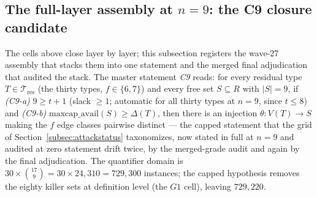 \subsection{The full-layer assembly at $n=9$: the C9 closure candidate}
\label{subsec:c9asm}

The cells above close layer by layer; this subsection registers the wave-27
assembly that stacks them into one statement and the merged final adjudication
that audited the stack. The master statement \emph{C9} reads: for every
residual type $T\in\mathcal{T}_{\mathrm{res}}$ (the thirty types,
$f\in\{6,7\}$) and every free set $S\subseteq R$ with $|S|=9$, if
\emph{(C9-a)} $9\ge t+1$ (slack $\ge1$; automatic for all thirty types at
$n=9$, since $t\le8$) and \emph{(C9-b)} $\mathrm{maxcap\_avail}(S)\ge\Delta(T)$,
then there is an injection $\theta:V(T)\to S$ making the $f$ edge classes
pairwise distinct --- the capped statement that the grid of
Section~\ref{subsec:attackstatus} taxonomizes, now stated in full at $n=9$ and
audited at zero statement drift twice, by the merged-grade audit and again by
the final adjudication. The quantifier domain is
$30\times\binom{17}{9}=30\times24{,}310=729{,}300$ instances; the capped
hypothesis removes the eighty killer sets at definition level (the $G1$ cell),
leaving $729{,}220$.

